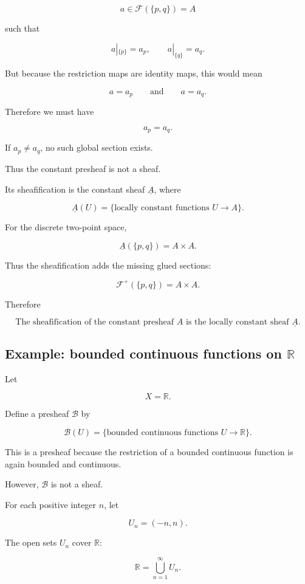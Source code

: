 \documentclass[12pt,a4paper]{article}
\theoremstyle{notespace}
\newcommand{\F}{\mathcal F}
\newcommand{\B}{\mathcal B}
\begin{document}
	\[
	a\in \F(\{p,q\})=A
	\]
	
	such that
	
	\[
	a|_{\{p\}}=a_p,
	\qquad
	a|_{\{q\}}=a_q.
	\]
	
	But because the restriction maps are identity maps, this would mean
	
	\[
	a=a_p
	\qquad
	\text{and}
	\qquad
	a=a_q.
	\]
	
	Therefore we must have
	
	\[
	a_p=a_q.
	\]
	
	If $a_p\neq a_q$, no such global section exists.
	
	Thus the constant presheaf is not a sheaf.
	
	Its sheafification is the constant sheaf $\underline A$, where
	
	\[
	\underline A(U)
	=
	\{\text{locally constant functions } U\to A\}.
	\]
	
	For the discrete two-point space,
	
	\[
	\underline A(\{p,q\})
	=
	A\times A.
	\]
	
	Thus the sheafification adds the missing glued sections:
	
	\[
	\F^+(\{p,q\})=A\times A.
	\]
	
	Therefore
	
	\[
	\boxed{
		\text{The sheafification of the constant presheaf } A
		\text{ is the locally constant sheaf } \underline A.
	}
	\]
	
	\subsection{Example: bounded continuous functions on $\mathbb R$}
	
	Let
	
	\[
	X=\mathbb R.
	\]
	
	Define a presheaf $\B$ by
	
	\[
	\B(U)
	=
	\{\text{bounded continuous functions } U\to \mathbb R\}.
	\]
	
	This is a presheaf because the restriction of a bounded continuous function is
	again bounded and continuous.
	
	However, $\B$ is not a sheaf.
	
	For each positive integer $n$, let
	
	\[
	U_n=(-n,n).
	\]
	
	The open sets $U_n$ cover $\mathbb R$:
	
	\[
	\mathbb R=\bigcup_{n=1}^{\infty} U_n.
	\]
	
\end{document}
